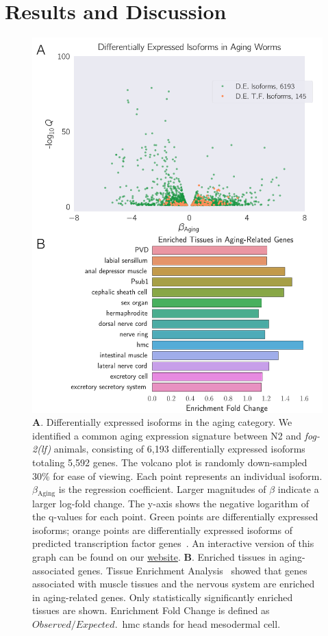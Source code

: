 \documentclass[9pt,twocolumn,twoside]{gsag3jnl}
\newcommand{\fog}{\emph{\mbox{fog-2(lf)}}}
\newcommand{\agen}{5,592}
\newcommand{\webref}{
\href{https://wormlabcaltech.github.io/Angeles_Leighton_2016}{website}}
\begin{document}
\section{Results and Discussion}
\begin{figure}[htbp]
  \renewcommand{\familydefault}{\sfdefault}\normalfont{}
  \centering
  \includegraphics[width=\linewidth]{../../output/figs/final_figs/aging_transcriptomics.pdf}
  \caption{
    \textbf{A}. Differentially expressed isoforms in the aging category.
    We identified a common aging expression signature between N2 and
    \fog{} animals, consisting of 6,193 differentially expressed isoforms
    totaling \agen{} genes. The volcano plot is randomly down-sampled 30\% for
    ease of viewing. Each point represents an individual isoform.
    $\beta{}_\mathrm{Aging}$ is the regression coefficient. Larger magnitudes of
    $\beta$ indicate a larger log-fold change. The y-axis shows the negative
    logarithm of the q-values for each point. Green points are differentially
    expressed isoforms; orange points are differentially expressed isoforms of
    predicted transcription factor genes~\citep{Reece-Hoyes2005}. An interactive
    version of this graph can be found on our \webref{}.
    \textbf{B}. Enriched tissues in aging-associated genes. Tissue
    Enrichment Analysis~\citep{Angeles-Albores2016} showed that genes associated
    with muscle tissues and the nervous system are enriched in aging-related
    genes. Only statistically significantly enriched tissues are shown.
    Enrichment Fold Change is defined as $Observed/Expected$.\ hmc stands for
    head mesodermal cell.
  }
\label{fig:agingtranscriptome}
\end{figure}
\end{document}
